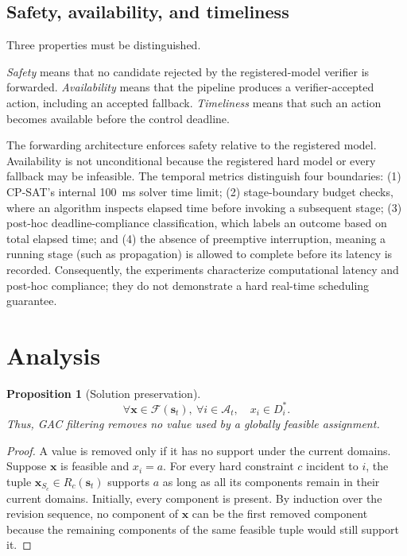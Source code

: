 \documentclass[pdflatex,sn-mathphys-num,iicol,oneside]{sn-jnl}
\newcommand{\gac}{\textsc{GAC}\xspace}
\newcommand{\cpsat}{\textsc{CP-SAT}\xspace}
\newtheorem{proposition}{Proposition}
\begin{document}
\subsection{Safety, availability, and timeliness}
\label{sec:timing-semantics}

Three properties must be distinguished.

\emph{Safety} means that no candidate rejected by the
registered-model verifier is forwarded. \emph{Availability} means
that the pipeline produces a verifier-accepted action, including an
accepted fallback. \emph{Timeliness} means that such an action becomes
available before the control deadline.

The forwarding architecture enforces safety relative to the registered
model. Availability is not unconditional because the registered hard
model or every fallback may be infeasible. The temporal metrics distinguish four boundaries: (1) \cpsat's internal 100~ms solver time limit; (2) stage-boundary budget checks, where an algorithm inspects elapsed time before invoking a subsequent stage; (3) post-hoc deadline-compliance classification, which labels an outcome based on total elapsed time; and (4) the absence of preemptive interruption, meaning a running stage (such as propagation) is allowed to complete before its latency is recorded. Consequently, the experiments characterize
computational latency and post-hoc compliance; they do not demonstrate
a hard real-time scheduling guarantee.

\section{Analysis}
\label{sec:analysis}

\begin{proposition}[Solution preservation]
\label{prop:preservation}
\[
\forall \bm{x}\in\mathcal{F}(\bm{s}_t),\ \forall i\in\mathcal{A}_t,\quad x_i\in D_i^{*}.
\]
Thus, \gac filtering removes no value used by a globally feasible assignment.
\end{proposition}

\begin{proof}
A value is removed only if it has no support under the current
domains. Suppose $\bm{x}$ is feasible and $x_i=a$. For every hard
constraint $c$ incident to $i$, the tuple
$\bm{x}_{S_c}\in R_c(\bm{s}_t)$ supports $a$ as long as all its
components remain in their current domains. Initially, every
component is present. By induction over the revision sequence, no
component of $\bm{x}$ can be the first removed component because the
remaining components of the same feasible tuple would still support
it.
\end{proof}
\end{document}
